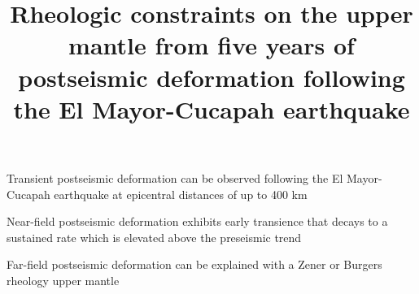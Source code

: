 \documentclass[draft,linenumbers]{AGUJournal}
\begin{document}
\title{Rheologic constraints on the upper mantle from five years of postseismic deformation following the El Mayor-Cucapah earthquake}







\begin{keypoints}
\item Transient postseismic deformation can be observed following the El Mayor-Cucapah earthquake at epicentral distances of up to 400 km

\item Near-field postseismic deformation exhibits early transience that decays to a sustained rate which is elevated above the preseismic trend 

\item Far-field postseismic deformation can be explained with a Zener or Burgers rheology upper mantle 

\end{keypoints}
\end{document}
